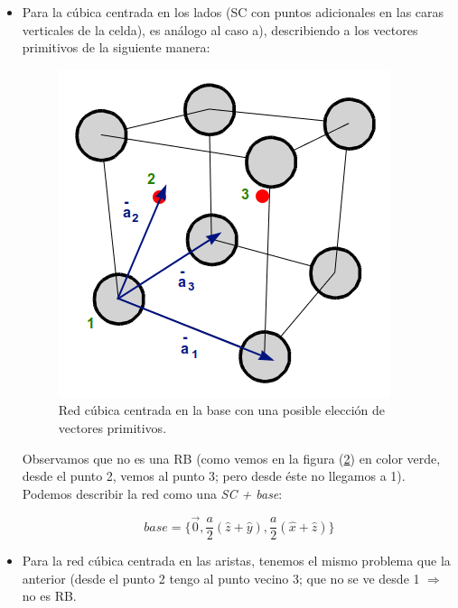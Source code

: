 \documentclass[a4paper]{article}
\begin{document}
\begin{itemize}
\begin{figure}[H]
\begin{subfigure}[b]{0.4\linewidth}
    \caption{Vista cenital de la red peri\'odica.}
  \end{subfigure}
  \label{fig:cubo3d_ej1}
\end{figure}

Esta red puede pensarse como suma de planos con dos redes SC en dos dimensiones superpuestas, por lo tanto, es red de Bravais (de ahora en adelante, RB).

Una posible elecci\'on de vectores primitivos es la siguiente:

$$\begin{cases}
\vec{a}_{1} = a\hat{x} \\
\vec{a}_{2} = \frac{a}{2}(\hat{x} + \hat{y}) \\
\vec{a}_{3} = a\hat{z}
\end{cases}$$

\item Para la c\'ubica centrada en los lados (SC con puntos adicionales en las caras verticales de la celda), es an\'alogo al caso a), describiendo a los vectores primitivos de la siguiente manera:

\begin{figure}[H]
  \centering
  \includegraphics[width=0.5\linewidth,height=0.5\linewidth]{cubo3d_ej2.png}
  \caption{Red c\'ubica centrada en la base con una posible elecci\'on de vectores primitivos.}
  \label{fig:cubo3d_ej2}
\end{figure}

Observamos que no es una RB (como vemos en la figura (\ref{fig:cubo3d_ej2}) en color verde, desde el punto 2, vemos al punto 3; pero desde \'este no llegamos a 1). Podemos describir la red como una \textit{SC + base}:

$$base = \{ \vec{0}, \frac{a}{2}(\hat{z} + \hat{y}), \frac{a}{2}(\hat{x} + \hat{z})\}$$

\item Para la red c\'ubica centrada en las aristas, tenemos el mismo problema que la anterior (desde el punto 2 tengo al punto vecino 3; que no se ve desde 1 $\Rightarrow$ no es RB.


\end{itemize}
\end{document}
